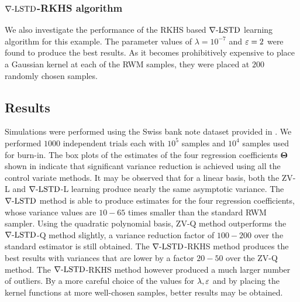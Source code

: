 \noindent \subsubsection*{$\nabla\text{-LSTD}$-RKHS algorithm}
We also investigate the performance of the RKHS based $\nabla\text{-LSTD}$ learning algorithm for this example.  The parameter values of $\lambda = 10^{-7}$ and $\varepsilon = 2$ were found to produce the best results.  As it becomes prohibitively expensive to place a Gaussian kernel at each of the RWM samples, they were placed at $200$ randomly chosen samples.
\noindent \subsection*{Results}
Simulations were performed using the Swiss bank note dataset provided in \cite{papmirgir14}. We performed $1000$ independent trials each with  $10^5$ samples and $10^4$ samples used for burn-in. The box plots of the estimates of the four regression coefficients $\boldsymbol{\Theta}$ shown in  indicate that significant variance reduction is  achieved using all the control variate methods. It may be observed that for a linear basis, both the ZV-L and $\nabla\text{-LSTD}$-L learning produce nearly the same asymptotic variance. The $\nabla\text{-LSTD}$ method is able to produce estimates for the four regression coefficients, whose variance values are $10-65$ times smaller than the standard RWM sampler. Using the quadratic polynomial basis, ZV-Q method outperforms the $\nabla\text{-LSTD}$-Q method slightly, a variance reduction factor of $100-200$ over the standard estimator is still obtained. The $\nabla\text{-LSTD}$-RKHS method produces the best results with variances that are lower by a factor $20-50$ over the ZV-Q method. The $\nabla\text{-LSTD}$-RKHS method however produced a much larger number of outliers. By a more careful choice of the values for $\lambda,\varepsilon$ and by placing the kernel functions at more well-chosen samples, better results may be obtained.

